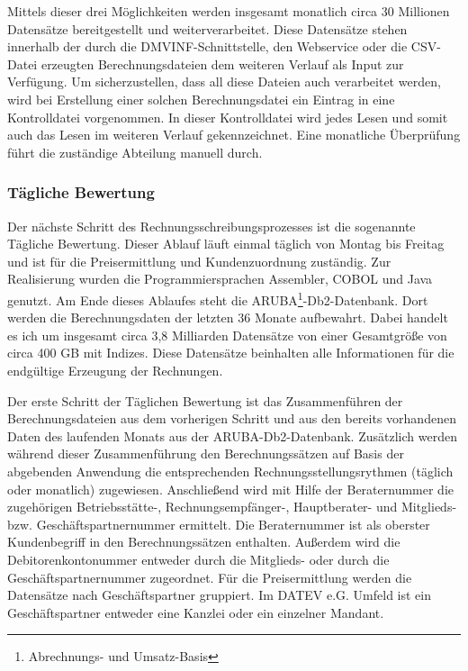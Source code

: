 Mittels dieser drei Möglichkeiten werden insgesamt monatlich circa 30 Millionen Datensätze bereitgestellt und weiterverarbeitet.
Diese Datensätze stehen innerhalb der durch die DMVINF-Schnittstelle, den Webservice oder die CSV-Datei erzeugten Berechnungsdateien dem weiteren Verlauf als Input zur Verfügung.
Um sicherzustellen, dass all diese Dateien auch verarbeitet werden, wird bei Erstellung einer solchen Berechnungsdatei ein Eintrag in eine Kontrolldatei vorgenommen.
In dieser Kontrolldatei wird jedes Lesen und somit auch das Lesen im weiteren Verlauf gekennzeichnet.
Eine monatliche Überprüfung führt die zuständige Abteilung manuell durch. 

\subsubsection{Tägliche Bewertung}\label{sssec:täglbew}
Der nächste Schritt des Rechnungsschreibungsprozesses ist die sogenannte \glqq Tägliche Bewertung\grqq.
Dieser Ablauf läuft einmal täglich von Montag bis Freitag und ist für die Preisermittlung und Kundenzuordnung zuständig.
Zur Realisierung wurden die Programmiersprachen Assembler, COBOL und Java genutzt.
Am Ende dieses Ablaufes steht die ARUBA\footnote{Abrechnungs- und Umsatz-Basis}-Db2-Datenbank.
Dort werden die Berechnungsdaten der letzten 36 Monate aufbewahrt.
Dabei handelt es ich um insgesamt circa 3,8 Milliarden Datensätze von einer Gesamtgröße von circa 400 GB mit Indizes.
Diese Datensätze beinhalten alle Informationen für die endgültige Erzeugung der Rechnungen.

Der erste Schritt der Täglichen Bewertung ist das Zusammenführen der Berechnungsdateien aus dem vorherigen Schritt und aus den bereits vorhandenen Daten des laufenden Monats aus der ARUBA-Db2-Datenbank.
Zusätzlich werden während dieser Zusammenführung den Berechnungssätzen auf Basis der abgebenden Anwendung die entsprechenden Rechnungsstellungsrythmen (täglich oder monatlich) zugewiesen.
Anschließend wird mit Hilfe der Beraternummer die zugehörigen Betriebsstätte-, Rechnungsempfänger-, Hauptberater- und Mitglieds- bzw. Geschäftspartnernummer ermittelt.
Die Beraternummer ist als oberster Kundenbegriff in den Berechnungssätzen enthalten.
Außerdem wird die Debitorenkontonummer entweder durch die Mitglieds- oder durch die Geschäftspartnernummer zugeordnet.
Für die Preisermittlung werden die Datensätze nach Geschäftspartner gruppiert.
Im DATEV e.G. Umfeld ist ein Geschäftspartner entweder eine Kanzlei oder ein einzelner Mandant.

